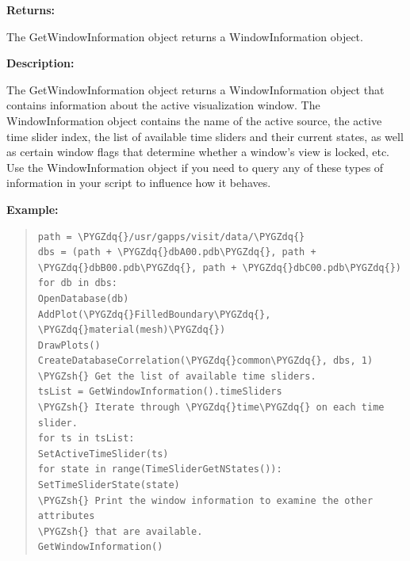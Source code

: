 \documentclass[letterpaper,10pt,english]{sphinxmanual}
\def\PYGZsh{\char`\#}
\def\PYGZdq{\char`\"}
\begin{document}
\begin{DUlineblock}{0em}
\item[] 
\item[] \textbf{Returns:}
\item[] The GetWindowInformation object returns a WindowInformation object.
\item[] 
\item[] \textbf{Description:}
\item[] The GetWindowInformation object returns a WindowInformation object that
contains information about the active visualization window. The
WindowInformation object contains the name of the active source, the active
time slider index, the list of available time sliders and their current
states, as well as certain window flags that determine whether a window's
view is locked, etc. Use the WindowInformation object if you need to query
any of these types of information in your script to influence how it
behaves.
\end{DUlineblock}

\begin{DUlineblock}{0em}
\item[] 
\end{DUlineblock}

\begin{DUlineblock}{0em}
\item[] \textbf{Example:}
\item[] 
\end{DUlineblock}
\begin{quote}

\begin{Verbatim}[commandchars=\\\{\}]
path = \PYGZdq{}/usr/gapps/visit/data/\PYGZdq{}
dbs = (path + \PYGZdq{}dbA00.pdb\PYGZdq{}, path + \PYGZdq{}dbB00.pdb\PYGZdq{}, path + \PYGZdq{}dbC00.pdb\PYGZdq{})
for db in dbs:
OpenDatabase(db)
AddPlot(\PYGZdq{}FilledBoundary\PYGZdq{}, \PYGZdq{}material(mesh)\PYGZdq{})
DrawPlots()
CreateDatabaseCorrelation(\PYGZdq{}common\PYGZdq{}, dbs, 1)
\PYGZsh{} Get the list of available time sliders.
tsList = GetWindowInformation().timeSliders
\PYGZsh{} Iterate through \PYGZdq{}time\PYGZdq{} on each time slider.
for ts in tsList:
SetActiveTimeSlider(ts)
for state in range(TimeSliderGetNStates()):
SetTimeSliderState(state)
\PYGZsh{} Print the window information to examine the other attributes
\PYGZsh{} that are available.
GetWindowInformation()
\end{Verbatim}
\end{quote}
\end{document}
